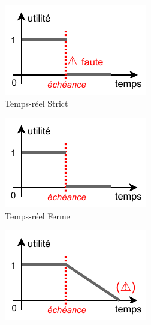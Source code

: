 \documentclass[french, a4paper, 11pt, twoside, pdftex]{StyleThese}
\begin{document}
		\begin{figure}[ht!]
			\centering
			\begin{subfigure}{.3\textwidth} \centering
				\includegraphics[width=\linewidth]{schemas/SdF_TempsReelDUR}
				\caption[]{Temps-réel Strict}
				\label{fig:tempReelDur}
			\end{subfigure}
			\begin{subfigure}{.3\textwidth} \centering
				\includegraphics[width=\linewidth]{schemas/SdF_TempsReelFERME}
				\caption[]{Temps-réel Ferme}
				\label{fig:tempReelFerme}
			\end{subfigure}
			\begin{subfigure}{.3\textwidth} \centering
				\includegraphics[width=\linewidth]{schemas/SdF_TempsReelMOU}

\end{subfigure}
\end{figure}
\end{document}
